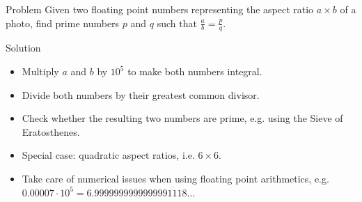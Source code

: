\begin{slide}
    \begin{block}{Problem}
        Given two floating point numbers representing the aspect ratio $a \times b$ of a photo, find prime numbers $p$ and $q$ such that $\frac{a}{b} = \frac{p}{q}$.
    \end{block}
    \pause
    \begin{block}{Solution}
        \begin{itemize}
        	\item Multiply $a$ and $b$ by $10^5$ to make both numbers integral.
        	\item Divide both numbers by their greatest common divisor.
          \item Check whether the resulting two numbers are prime, e.g. using the Sieve of Eratosthenes.
        	\item Special case: quadratic aspect ratios, i.e. $6 \times 6$.
          \item Take care of numerical issues when using floating point arithmetics, e.g. $0.00007 \cdot 10^5 = 6.9999999999999991118\ldots$
        \end{itemize}
    \end{block}
\end{slide}
